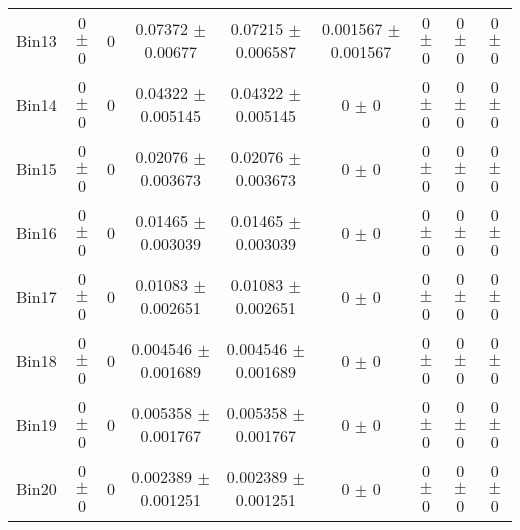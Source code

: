 \begin{tabular}{@{\extracolsep{4pt}}lcccccccc@{}}
     Bin13 & 0 $\pm$ 0 & 0 & 0.07372 $\pm$ 0.00677 & 0.07215 $\pm$ 0.006587 & 0.001567 $\pm$ 0.001567 & 0 $\pm$ 0 & 0 $\pm$ 0 & 0 $\pm$ 0 \\ 
     Bin14 & 0 $\pm$ 0 & 0 & 0.04322 $\pm$ 0.005145 & 0.04322 $\pm$ 0.005145 & 0 $\pm$ 0 & 0 $\pm$ 0 & 0 $\pm$ 0 & 0 $\pm$ 0 \\ 
     Bin15 & 0 $\pm$ 0 & 0 & 0.02076 $\pm$ 0.003673 & 0.02076 $\pm$ 0.003673 & 0 $\pm$ 0 & 0 $\pm$ 0 & 0 $\pm$ 0 & 0 $\pm$ 0 \\ 
     Bin16 & 0 $\pm$ 0 & 0 & 0.01465 $\pm$ 0.003039 & 0.01465 $\pm$ 0.003039 & 0 $\pm$ 0 & 0 $\pm$ 0 & 0 $\pm$ 0 & 0 $\pm$ 0 \\ 
     Bin17 & 0 $\pm$ 0 & 0 & 0.01083 $\pm$ 0.002651 & 0.01083 $\pm$ 0.002651 & 0 $\pm$ 0 & 0 $\pm$ 0 & 0 $\pm$ 0 & 0 $\pm$ 0 \\ 
     Bin18 & 0 $\pm$ 0 & 0 & 0.004546 $\pm$ 0.001689 & 0.004546 $\pm$ 0.001689 & 0 $\pm$ 0 & 0 $\pm$ 0 & 0 $\pm$ 0 & 0 $\pm$ 0 \\ 
     Bin19 & 0 $\pm$ 0 & 0 & 0.005358 $\pm$ 0.001767 & 0.005358 $\pm$ 0.001767 & 0 $\pm$ 0 & 0 $\pm$ 0 & 0 $\pm$ 0 & 0 $\pm$ 0 \\ 
     Bin20 & 0 $\pm$ 0 & 0 & 0.002389 $\pm$ 0.001251 & 0.002389 $\pm$ 0.001251 & 0 $\pm$ 0 & 0 $\pm$ 0 & 0 $\pm$ 0 & 0 $\pm$ 0 \\ 
\hline\hline
  \end{tabular}
